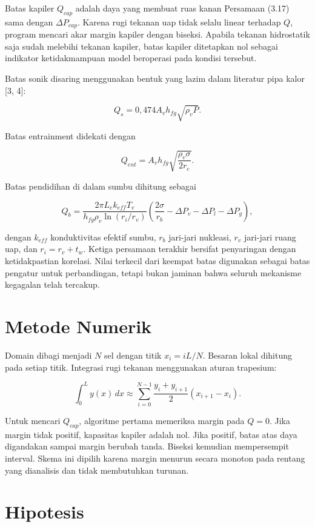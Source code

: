\documentclass[
  12pt,
  12pt,a4paper,oneside]{report}
\begin{document}
Batas kapiler \(Q_{cap}\) adalah daya yang membuat ruas kanan Persamaan
(3.17) sama dengan \(\Delta P_{cap}\). Karena rugi tekanan uap tidak
selalu linear terhadap \(Q\), program mencari akar margin kapiler dengan
biseksi. Apabila tekanan hidrostatik saja sudah melebihi tekanan
kapiler, batas kapiler ditetapkan nol sebagai indikator ketidakmampuan
model beroperasi pada kondisi tersebut.

Batas sonik disaring menggunakan bentuk yang lazim dalam literatur pipa
kalor {[}3, 4{]}:

\[
Q_s=0{,}474 A_v h_{fg}\sqrt{\rho_vP}.
\tag{3.19}\]

Batas entrainment didekati dengan

\[
Q_{ent}=A_v h_{fg}\sqrt{\frac{\rho_v\sigma}{2r_c}}.
\tag{3.20}\]

Batas pendidihan di dalam sumbu dihitung sebagai

\[
Q_b=\frac{2\pi L_e k_{eff}T_v}{h_{fg}\rho_v\ln(r_i/r_v)}
\left(\frac{2\sigma}{r_b}-\Delta P_v-\Delta P_l-\Delta P_g\right),
\tag{3.21}\]

dengan \(k_{eff}\) konduktivitas efektif sumbu, \(r_b\) jari-jari
nukleasi, \(r_v\) jari-jari ruang uap, dan \(r_i=r_v+t_w\). Ketiga
persamaan terakhir bersifat penyaringan dengan ketidakpastian korelasi.
Nilai terkecil dari keempat batas digunakan sebagai batas pengatur untuk
perbandingan, tetapi bukan jaminan bahwa seluruh mekanisme kegagalan
telah tercakup.

\hypertarget{metode-numerik}{%
\section{Metode Numerik}\label{metode-numerik}}

Domain dibagi menjadi \(N\) sel dengan titik \(x_i=iL/N\). Besaran lokal
dihitung pada setiap titik. Integrasi rugi tekanan menggunakan aturan
trapesium:

\[
\int_0^L y(x)\,dx\approx\sum_{i=0}^{N-1}\frac{y_i+y_{i+1}}{2}(x_{i+1}-x_i).
\tag{3.22}\]

Untuk mencari \(Q_{cap}\), algoritme pertama memeriksa margin pada
\(Q=0\). Jika margin tidak positif, kapasitas kapiler adalah nol. Jika
positif, batas atas daya digandakan sampai margin berubah tanda. Biseksi
kemudian mempersempit interval. Skema ini dipilih karena margin menurun
secara monoton pada rentang yang dianalisis dan tidak membutuhkan
turunan.

\hypertarget{hipotesis}{%
\section{Hipotesis}\label{hipotesis}}
\end{document}
